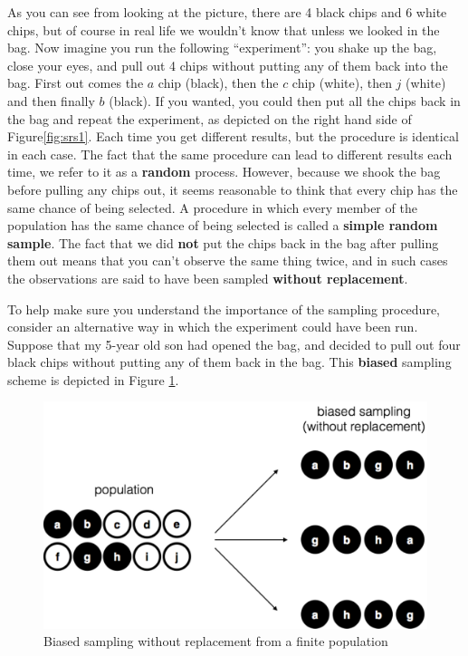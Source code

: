\documentclass[
]{book}
\begin{document}
As you can see from looking at the picture, there are 4 black chips and 6 white chips, but of course in real life we wouldn't know that unless we looked in the bag. Now imagine you run the following ``experiment'': you shake up the bag, close your eyes, and pull out 4 chips without putting any of them back into the bag. First out comes the \(a\) chip (black), then the \(c\) chip (white), then \(j\) (white) and then finally \(b\) (black). If you wanted, you could then put all the chips back in the bag and repeat the experiment, as depicted on the right hand side of Figure\ref{fig:srs1}. Each time you get different results, but the procedure is identical in each case. The fact that the same procedure can lead to different results each time, we refer to it as a \textbf{random} process. However, because we shook the bag before pulling any chips out, it seems reasonable to think that every chip has the same chance of being selected. A procedure in which every member of the population has the same chance of being selected is called a \textbf{simple random sample}. The fact that we did \textbf{not} put the chips back in the bag after pulling them out means that you can't observe the same thing twice, and in such cases the observations are said to have been sampled \textbf{without replacement}.

To help make sure you understand the importance of the sampling procedure, consider an alternative way in which the experiment could have been run. Suppose that my 5-year old son had opened the bag, and decided to pull out four black chips without putting any of them back in the bag. This \textbf{biased} sampling scheme is depicted in Figure \ref{fig:brs}.

\begin{figure}
\centering
\includegraphics{navarro_img/estimation/brs.pdf}
\caption{\label{fig:brs}Biased sampling without replacement from a finite population}
\end{figure}
\end{document}
